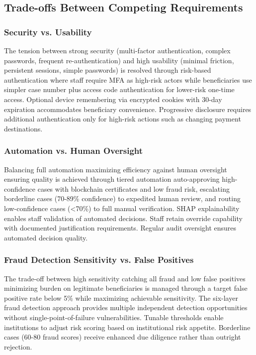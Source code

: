 \subsection{Trade-offs Between Competing Requirements}

\subsubsection{Security vs. Usability}

The tension between strong security (multi-factor authentication, complex passwords, frequent re-authentication) and high usability (minimal friction, persistent sessions, simple passwords) is resolved through risk-based authentication where staff require MFA as high-risk actors while beneficiaries use simpler case number plus access code authentication for lower-risk one-time access. Optional device remembering via encrypted cookies with 30-day expiration accommodates beneficiary convenience. Progressive disclosure requires additional authentication only for high-risk actions such as changing payment destinations.

\subsubsection{Automation vs. Human Oversight}

Balancing full automation maximizing efficiency against human oversight ensuring quality is achieved through tiered automation auto-approving high-confidence cases with blockchain certificates and low fraud risk, escalating borderline cases (70-89\% confidence) to expedited human review, and routing low-confidence cases (<70\%) to full manual verification. SHAP explainability enables staff validation of automated decisions. Staff retain override capability with documented justification requirements. Regular audit oversight ensures automated decision quality.

\subsubsection{Fraud Detection Sensitivity vs. False Positives}

The trade-off between high sensitivity catching all fraud and low false positives minimizing burden on legitimate beneficiaries is managed through a target false positive rate below 5\% while maximizing achievable sensitivity. The six-layer fraud detection approach provides multiple independent detection opportunities without single-point-of-failure vulnerabilities. Tunable thresholds enable institutions to adjust risk scoring based on institutional risk appetite. Borderline cases (60-80 fraud scores) receive enhanced due diligence rather than outright rejection.

